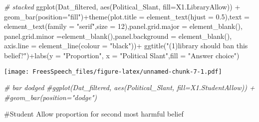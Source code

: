 \documentclass[
]{article}
\newenvironment{Shaded}{\begin{snugshade}}{\end{snugshade}}
\newcommand{\AttributeTok}[1]{\textcolor[rgb]{0.77,0.63,0.00}{#1}}
\newcommand{\CommentTok}[1]{\textcolor[rgb]{0.56,0.35,0.01}{\textit{#1}}}
\newcommand{\DecValTok}[1]{\textcolor[rgb]{0.00,0.00,0.81}{#1}}
\newcommand{\FloatTok}[1]{\textcolor[rgb]{0.00,0.00,0.81}{#1}}
\newcommand{\FunctionTok}[1]{\textcolor[rgb]{0.00,0.00,0.00}{#1}}
\newcommand{\NormalTok}[1]{#1}
\newcommand{\SpecialCharTok}[1]{\textcolor[rgb]{0.00,0.00,0.00}{#1}}
\newcommand{\StringTok}[1]{\textcolor[rgb]{0.31,0.60,0.02}{#1}}
\begin{document}
\begin{Shaded}
\begin{Highlighting}[]
\CommentTok{\# stacked}
\FunctionTok{ggplot}\NormalTok{(Dat\_filtered, }\FunctionTok{aes}\NormalTok{(Political\_Slant, }\AttributeTok{fill=}\NormalTok{X1.LibraryAllow)) }\SpecialCharTok{+} 
  \FunctionTok{geom\_bar}\NormalTok{(}\AttributeTok{position=}\StringTok{"fill"}\NormalTok{)}\SpecialCharTok{+}\FunctionTok{theme}\NormalTok{(}\AttributeTok{plot.title =} \FunctionTok{element\_text}\NormalTok{(}\AttributeTok{hjust =} \FloatTok{0.5}\NormalTok{),}\AttributeTok{text =} \FunctionTok{element\_text}\NormalTok{(}\AttributeTok{family =} \StringTok{"serif"}\NormalTok{,}\AttributeTok{size =} \DecValTok{12}\NormalTok{),}\AttributeTok{panel.grid.major =} \FunctionTok{element\_blank}\NormalTok{(), }\AttributeTok{panel.grid.minor =}\FunctionTok{element\_blank}\NormalTok{(),}\AttributeTok{panel.background =} \FunctionTok{element\_blank}\NormalTok{(), }\AttributeTok{axis.line =} \FunctionTok{element\_line}\NormalTok{(}\AttributeTok{colour =} \StringTok{"black"}\NormalTok{))}\SpecialCharTok{+}
\FunctionTok{ggtitle}\NormalTok{(}\StringTok{"(1)library should ban this belief?"}\NormalTok{)}\SpecialCharTok{+}\FunctionTok{labs}\NormalTok{(}\AttributeTok{y =} \StringTok{"Proportion"}\NormalTok{, }\AttributeTok{x =} \StringTok{"Political Slant"}\NormalTok{,}\AttributeTok{fill =} \StringTok{"Answer choice"}\NormalTok{)}
\end{Highlighting}
\end{Shaded}

\texttt{[image: FreesSpeech\_files/figure-latex/unnamed-chunk-7-1.pdf]}

\begin{Shaded}
\begin{Highlighting}[]
\CommentTok{\# bar dodged}
\CommentTok{\#ggplot(Dat\_filtered, aes(Political\_Slant, fill=X1.StudentAllow)) + }
  \CommentTok{\#geom\_bar(position="dodge")}
\end{Highlighting}
\end{Shaded}

\#Student Allow proportion for second most harmful belief
\end{document}
